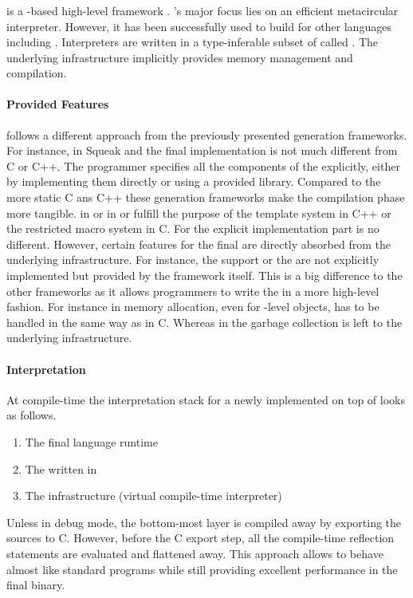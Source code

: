 \subsubsection*{\PyPy}
 is a \Python-based high-level \VM framework \cite{Rigo06a}.
\PyPy's major focus lies on an efficient metacircular \Python interpreter.
However, it has been successfully used to build \VMs for other languages including \ST \cite{Bolz08a}.
Interpreters are written in a type-inferable subset of \Python called \RPython.
The underlying \PyPy infrastructure implicitly provides memory management and \JIT compilation.

\paragraph{Provided \VM Features}
\PyPy follows a different approach from the previously presented \VM generation frameworks.
For instance, in Squeak and \Jikes the final \VM implementation is not much different from C or C++.
The programmer specifies all the components of the \VM explicitly, either by implementing them directly or using a provided library.
Compared to the more static C ans C++ these \VM generation frameworks make the compilation phase more tangible.
\ST in \Squeak or \Java in \Jikes or \Maxine fulfill the purpose of the template system in C++ or the restricted macro system in C.
For the explicit implementation part \PyPy is no different.
However, certain features for the final \VM are directly absorbed from the underlying \PyPy infrastructure.
For instance, the \JIT support or the \GC are not explicitly implemented but provided by the \PyPy framework itself.
This is a big difference to the other \VM frameworks as it allows programmers to write the \VM in a more high-level fashion.
For instance in \Squeak memory allocation, even for \VM-level objects, has to be handled in the same way as in C.
Whereas in \PyPy the garbage collection is left to the underlying infrastructure.

\paragraph{\RPython Interpretation}
At compile-time the interpretation stack for a newly implemented \VM on top of \PyPy looks as follows.
%
\begin{enumerate}
\item The final language runtime
\item The \VM written in \RPython
\item The \PyPy infrastructure (virtual compile-time \RPython interpreter)
\end{enumerate}
%
Unless in debug mode, the bottom-most layer is compiled away by exporting the \RPython sources to C.
However, before the C export step, all the compile-time reflection statements are evaluated and flattened away.
This approach allows \RPython \VMs to behave almost like standard \Python programs while still providing excellent performance in the final \VM binary.

